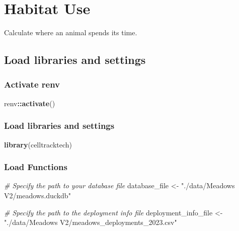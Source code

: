 \documentclass[
]{book}
\newenvironment{Shaded}{\begin{snugshade}}{\end{snugshade}}
\newcommand{\CommentTok}[1]{\textcolor[rgb]{0.56,0.35,0.01}{\textit{#1}}}
\newcommand{\FunctionTok}[1]{\textcolor[rgb]{0.13,0.29,0.53}{\textbf{#1}}}
\newcommand{\NormalTok}[1]{#1}
\newcommand{\OtherTok}[1]{\textcolor[rgb]{0.56,0.35,0.01}{#1}}
\newcommand{\SpecialCharTok}[1]{\textcolor[rgb]{0.81,0.36,0.00}{\textbf{#1}}}
\newcommand{\StringTok}[1]{\textcolor[rgb]{0.31,0.60,0.02}{#1}}
\begin{document}
\chapter{Habitat Use}\label{habitat-use}

Calculate where an animal spends its time.

\section{Load libraries and settings}\label{load-libraries-and-settings}

\subsection{Activate renv}\label{activate-renv}

\begin{Shaded}
\begin{Highlighting}[]
\NormalTok{renv}\SpecialCharTok{::}\FunctionTok{activate}\NormalTok{()}
\end{Highlighting}
\end{Shaded}

\subsection{Load libraries and settings}\label{load-libraries-and-settings-1}

\begin{Shaded}
\begin{Highlighting}[]
\FunctionTok{library}\NormalTok{(celltracktech)}
\end{Highlighting}
\end{Shaded}

\subsection{Load Functions}\label{load-functions}

\begin{Shaded}
\begin{Highlighting}[]
\CommentTok{\# Specify the path to your database file}
\NormalTok{database\_file }\OtherTok{\textless{}{-}} \StringTok{"./data/Meadows V2/meadows.duckdb"}

\CommentTok{\# Specify the path to the deployment info file}
\NormalTok{deployment\_info\_file }\OtherTok{\textless{}{-}} \StringTok{"./data/Meadows V2/meadows\_deployments\_2023.csv"}
\end{Highlighting}
\end{Shaded}
\end{document}
